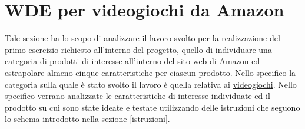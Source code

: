 \documentclass[12pt, letterpaper]{article}
\begin{document}
\section{WDE per videogiochi da Amazon} \label{sezione1}
Tale sezione ha lo scopo di analizzare il lavoro svolto per la realizzazione del primo esercizio richiesto all'interno del progetto, quello di individuare una categoria di prodotti di interesse all'interno del sito web di \href{https://www.amazon.it}{Amazon} ed estrapolare almeno cinque caratteristiche per ciascun prodotto. Nello specifico la categoria sulla quale è stato svolto il lavoro è quella relativa ai \href{https://www.amazon.it/s/ref=nb_sb_noss?__mk_it_IT=ÅMÅŽÕÑ&url=search-alias\%3Dvideogames&field-keywords=&crid=2GIVFOZXKUAZD&sprefix=\%2Cvideogames\%2C110}{videogiochi}.  Nello specifico verrano analizzate le caratteristiche di interesse individuate ed il prodotto su cui sono state ideate e testate utilizzando delle istruzioni che seguono lo schema introdotto nella sezione \ref{istruzioni}.
\end{document}
